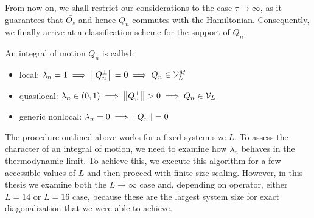 From now on, we shall restrict our considerations to the case \(\tau \to \infty \), 
as it guarantees that \(\bar{O_s}\) and hence \(Q_n\) commutes with the Hamiltonian. 
Consequently, we finally arrive at a classification scheme for the support of \(Q_n\).
\begin{definition}
  An integral of motion \(Q_n\) is called:
  \begin{itemize}
    \item local: \(\lambda_n = 1 \implies \norm{Q_n^{\perp}} = 0 \implies Q_n \in \mathcal{V}^M_L\)
    \item quasilocal: \(\lambda_n \in \left(0,1\right) \implies \norm{Q_n^{\perp}} > 0 \implies Q_n \in \mathcal{V}_L \)
    \item generic nonlocal: \(\lambda_n = 0 \implies \norm{Q_n} = 0\)
  \end{itemize}
  \label{def:classification}
\end{definition}
The procedure outlined above works for a fixed system size \(L\).
To assess the character of an integral of motion, we need to examine how \(\lambda_n\) 
behaves in the thermodynamic limit. To achieve this, we execute this algorithm for a 
few accessible values of \(L\) and then proceed with finite size scaling.
However, in this thesis we examine both the \(L\to \infty \) case and, depending on
operator, either \(L = 14\) or \(L = 16\)
case, because these are the largest system size for exact diagonalization that we were able to achieve.

